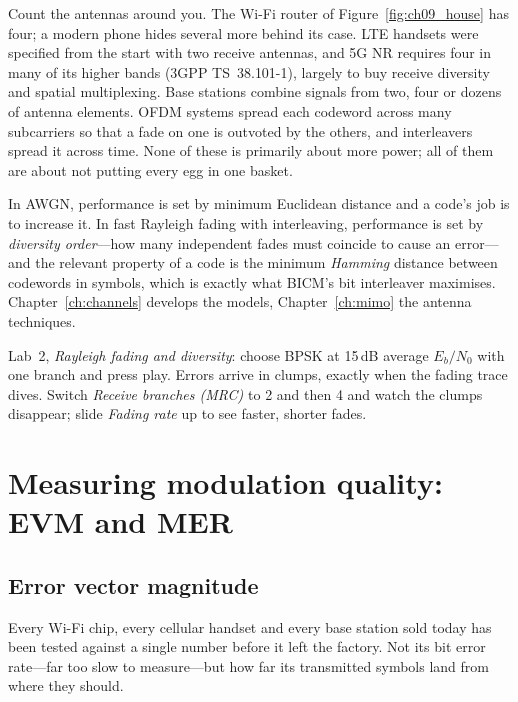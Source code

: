 \begin{inpractice}
Count the antennas around you. The Wi-Fi router of Figure~\ref{fig:ch09_house} has four; a
modern phone hides several more behind its case. LTE handsets were specified from the start with
two receive antennas, and 5G NR requires four in many of its higher bands (3GPP TS~38.101-1),
largely to buy receive diversity and spatial multiplexing. Base stations combine signals from
two, four or dozens of antenna elements. OFDM systems spread each codeword across many
subcarriers so that a fade on one is outvoted by the others, and interleavers spread it across
time. None of these is primarily about more power; all of them are about not putting every egg in
one basket.
\end{inpractice}

\begin{keyidea}
In AWGN, performance is set by minimum Euclidean distance and a code's job is to increase it. In
fast Rayleigh fading with interleaving, performance is set by \emph{diversity order}---how many
independent fades must coincide to cause an error---and the relevant property of a code is the
minimum \emph{Hamming} distance between codewords in symbols, which is exactly what BICM's bit
interleaver maximises. Chapter~\ref{ch:channels} develops the models, Chapter~\ref{ch:mimo} the
antenna techniques.
\end{keyidea}

\begin{tryit}
Lab~2, \emph{Rayleigh fading and diversity}: choose BPSK at 15\,dB average $E_b/N_0$ with one
branch and press play. Errors arrive in clumps, exactly when the fading trace dives. Switch
\emph{Receive branches (MRC)} to 2 and then 4 and watch the clumps disappear; slide \emph{Fading
rate} up to see faster, shorter fades.
\end{tryit}

\section{Measuring modulation quality: EVM and MER}
\label{sec:ch09:evm}

\subsection{Error vector magnitude}

Every Wi-Fi chip, every cellular handset and every base station sold today has been tested
against a single number before it left the factory. Not its bit error rate---far too slow to
measure---but how far its transmitted symbols land from where they should.

